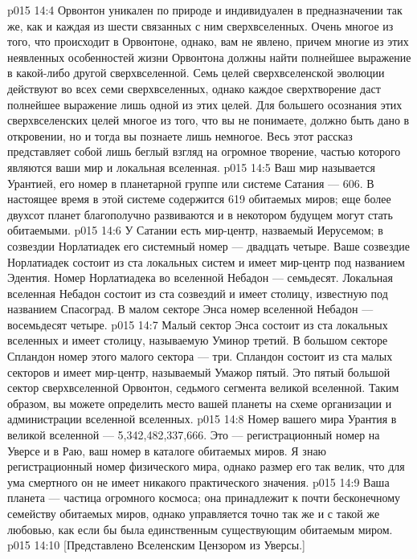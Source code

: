 \vs p015 14:4 Орвонтон уникален по природе и индивидуален в предназначении так же, как и каждая из шести связанных с ним сверхвселенных. Очень многое из того, что происходит в Орвонтоне, однако, вам не явлено, причем многие из этих неявленных особенностей жизни Орвонтона должны найти полнейшее выражение в какой\hyp{}либо другой сверхвселенной. Семь целей сверхвселенской эволюции действуют во всех семи сверхвселенных, однако каждое сверхтворение даст полнейшее выражение лишь одной из этих целей. Для большего осознания этих сверхвселенских целей многое из того, что вы не понимаете, должно быть дано в откровении, но и тогда вы познаете лишь немногое. Весь этот рассказ представляет собой лишь беглый взгляд на огромное творение, частью которого являются ваши мир и локальная вселенная.
\vs p015 14:5 \pc Ваш мир называется Урантией, его номер в планетарной группе или системе Сатания --- 606. В настоящее время в этой системе содержится 619 обитаемых миров; еще более двухсот планет благополучно развиваются и в некотором будущем могут стать обитаемыми.
\vs p015 14:6 У Сатании есть мир\hyp{}центр, назваемый Иерусемом; в созвездии Норлатиадек его системный номер --- двадцать четыре. Ваше созвездие Норлатиадек состоит из ста локальных систем и имеет мир\hyp{}центр под названием Эдентия. Номер Норлатиадека во вселенной Небадон --- семьдесят. Локальная вселенная Небадон состоит из ста созвездий и имеет столицу, известную под названием Спасоград. В малом секторе Энса номер вселенной Небадон --- восемьдесят четыре.
\vs p015 14:7 Малый сектор Энса состоит из ста локальных вселенных и имеет столицу, называемую Уминор третий. В большом секторе Спландон номер этого малого сектора --- три. Спландон состоит из ста малых секторов и имеет мир\hyp{}центр, называемый Умажор пятый. Это пятый большой сектор сверхвселенной Орвонтон, седьмого сегмента великой вселенной. Таким образом, вы можете определить место вашей планеты на схеме организации и администрации вселенной вселенных.
\vs p015 14:8 Номер вашего мира Урантия в великой вселенной --- 5,342,482,337,666. Это --- регистрационный номер на Уверсе и в Раю, ваш номер в каталоге обитаемых миров. Я знаю регистрационный номер физического мира, однако размер его так велик, что для ума смертного он не имеет никакого практического значения.
\vs p015 14:9 \pc Ваша планета --- частица огромного космоса; она принадлежит к почти бесконечному семейству обитаемых миров, однако управляется точно так же и с такой же любовью, как если бы была единственным существующим обитаемым миром.
\vsetoff
\vs p015 14:10 [Представлено Вселенским Цензором из Уверсы.]
